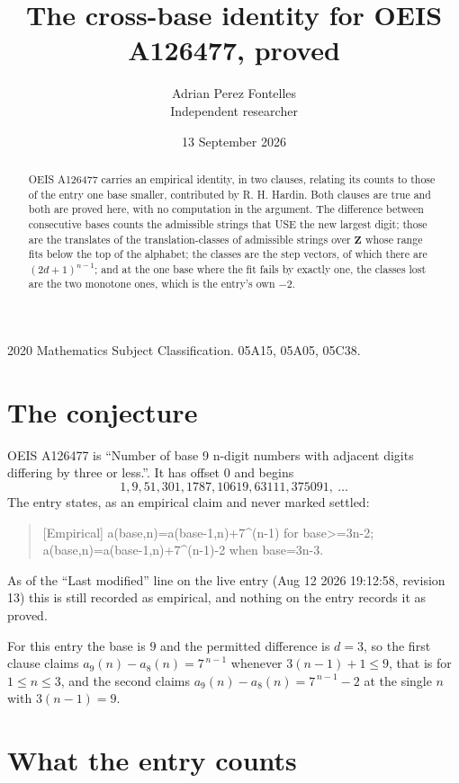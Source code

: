 \documentclass[11pt,a4paper]{article}
\title{The cross-base identity for OEIS A126477, proved}
\author{Adrian Perez Fontelles\\ \small Independent researcher}
\date{13 September 2026}
\theoremstyle{plain}
\theoremstyle{definition}
\begin{document}
\maketitle

\begin{abstract}
OEIS A126477 carries an empirical identity, in two clauses, relating its counts to those of the
entry one base smaller, contributed by R. H. Hardin. Both clauses are true and both are proved
here, with no computation in the argument. The difference between consecutive bases counts the
admissible strings that USE the new largest digit; those are the translates of the
translation-classes of admissible strings over $\mathbf{Z}$ whose range fits below the top of
the alphabet; the classes are the step vectors, of which there are $(2d+1)^{n-1}$; and at the
one base where the fit fails by exactly one, the classes lost are the two monotone ones, which
is the entry's own $-2$.
\end{abstract}

\noindent\small 2020 Mathematics Subject Classification. 05A15, 05A05, 05C38.\normalsize

\section{The conjecture}

OEIS A126477 is ``Number of base 9 n-digit numbers with adjacent digits differing by three or less.''. It has offset $0$ and begins
\[
1, 9, 51, 301, 1787, 10619, 63111, 375091,\ \dots
\]
The entry states, as an empirical claim and never marked settled:
\begin{quote}
[Empirical] a(base,n)=a(base-1,n)+7\textasciicircum{}(n-1) for base>=3n-2; a(base,n)=a(base-1,n)+7\textasciicircum{}(n-1)-2 when base=3n-3.
\end{quote}
As of the ``Last modified'' line on the live entry (Aug 12 2026 19:12:58, revision 13)
this is still recorded as empirical, and nothing on the entry records it as proved.

For this entry the base is $9$ and the permitted difference is $d=3$, so the first clause
claims $a_{9}(n)-a_{8}(n)=7^{\,n-1}$ whenever $3(n-1)+1\le9$, that is for
$1\le n\le3$, and the second claims $a_{9}(n)-a_{8}(n)=7^{\,n-1}-2$ at the single
$n$ with $3(n-1)=9$.

\section{What the entry counts}
\end{document}
